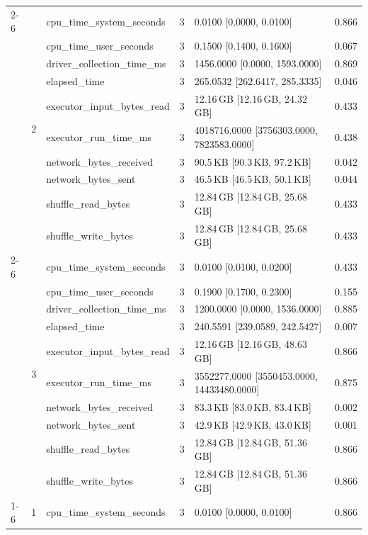 \begin{tabular}{lllrll}
\cline{2-6}
 & \multirow[t]{10}{*}{2} & cpu_time_system_seconds & 3 & 0.0100 [0.0000, 0.0100] & 0.866 \\
 &  & cpu_time_user_seconds & 3 & 0.1500 [0.1400, 0.1600] & 0.067 \\
 &  & driver_collection_time_ms & 3 & 1456.0000 [0.0000, 1593.0000] & 0.869 \\
 &  & elapsed_time & 3 & 265.0532 [262.6417, 285.3335] & 0.046 \\
 &  & executor_input_bytes_read & 3 & 12.16\,GB [12.16\,GB, 24.32\,GB] & 0.433 \\
 &  & executor_run_time_ms & 3 & 4018716.0000 [3756303.0000, 7823583.0000] & 0.438 \\
 &  & network_bytes_received & 3 & 90.5\,KB [90.3\,KB, 97.2\,KB] & 0.042 \\
 &  & network_bytes_sent & 3 & 46.5\,KB [46.5\,KB, 50.1\,KB] & 0.044 \\
 &  & shuffle_read_bytes & 3 & 12.84\,GB [12.84\,GB, 25.68\,GB] & 0.433 \\
 &  & shuffle_write_bytes & 3 & 12.84\,GB [12.84\,GB, 25.68\,GB] & 0.433 \\
\cline{2-6}
 & \multirow[t]{10}{*}{3} & cpu_time_system_seconds & 3 & 0.0100 [0.0100, 0.0200] & 0.433 \\
 &  & cpu_time_user_seconds & 3 & 0.1900 [0.1700, 0.2300] & 0.155 \\
 &  & driver_collection_time_ms & 3 & 1200.0000 [0.0000, 1536.0000] & 0.885 \\
 &  & elapsed_time & 3 & 240.5591 [239.0589, 242.5427] & 0.007 \\
 &  & executor_input_bytes_read & 3 & 12.16\,GB [12.16\,GB, 48.63\,GB] & 0.866 \\
 &  & executor_run_time_ms & 3 & 3552277.0000 [3550453.0000, 14433480.0000] & 0.875 \\
 &  & network_bytes_received & 3 & 83.3\,KB [83.0\,KB, 83.4\,KB] & 0.002 \\
 &  & network_bytes_sent & 3 & 42.9\,KB [42.9\,KB, 43.0\,KB] & 0.001 \\
 &  & shuffle_read_bytes & 3 & 12.84\,GB [12.84\,GB, 51.36\,GB] & 0.866 \\
 &  & shuffle_write_bytes & 3 & 12.84\,GB [12.84\,GB, 51.36\,GB] & 0.866 \\
\cline{1-6} \cline{2-6}
\multirow[t]{30}{*}{national-scale-spatial-join-databricks-broadcast-4-nodes-medium} & \multirow[t]{10}{*}{1} & cpu_time_system_seconds & 3 & 0.0100 [0.0000, 0.0100] & 0.866 \\

\end{tabular}
